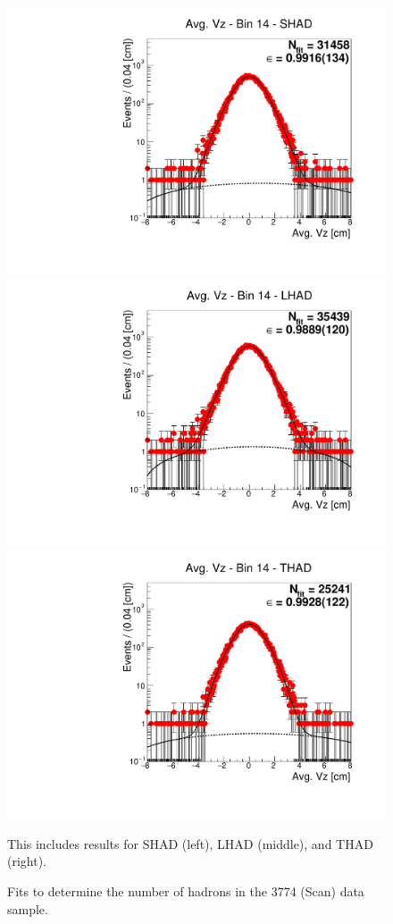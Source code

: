 \begin{figure}[H]
\centering
\includegraphics[scale=0.25]{figures/plots/nonDDbar_fit_results/scan/fit_scan_14_data_SHAD.pdf}
\hspace{-0.5cm}
\includegraphics[scale=0.25]{figures/plots/nonDDbar_fit_results/scan/fit_scan_14_data_LHAD.pdf}
\hspace{-0.5cm}
\includegraphics[scale=0.25]{figures/plots/nonDDbar_fit_results/scan/fit_scan_14_data_THAD.pdf}
\caption{Fits to determine the number of hadrons in the 3774 (Scan) data sample.}
{This includes results for SHAD (left), LHAD (middle), and THAD (right).}
\label{fig:hadron_fits_scan_14}
\end{figure}

